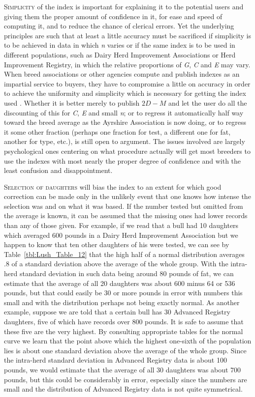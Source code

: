 \textsc{Simplicity} of the index is important for explaining
it to the potential users and giving them the proper amount of confidence
in it, for ease and speed of computing it, and to reduce the chance of
clerical errors. Yet the underlying principles are such that at least a
little accuracy must be sacrificed if simplicity is to be achieved in data
in which \textit{n} varies or if the same index is to be used in different
populations, such as Dairy Herd Improvement Associations or Herd Improvement
Registry, in which the relative proportions of \textit{G}, \textit{C} and
\textit{E} may vary. When breed associations or other agencies compute and
publish indexes as an impartial service to buyers, they have to compromise
a little on accuracy in order to achieve the uniformity and simplicity which
is necessary for getting the index used . Whether it is better merely to
publish $2D - M$ and let the user do all the discounting of this for
\textit{C}, \textit{E} and small \textit{n}; or to regress it automatically
half way toward the breed average as the Ayrshire Association is now doing,
or to regress it some other fraction (perhaps one fraction for test, a
different one for fat, another for type, etc.), is still open to argument.
The issues involved are largely psychological ones centering on what
procedure actually will get most breeders to use the indexes with most
nearly the proper degree of confidence and with the least confusion and
disappointment.

\textsc{Selection of daughters} will bias the index to an extent for which
good correction can be made only in the unlikely event that one knows
how intense the selection was and on what it was based. If the number
tested but omitted from the average is known, it can be assumed that the
missing ones had lower records than any of those given. For example,
if we read that a bull had 10 daughters which averaged 600 pounds in a
Dairy Herd Improvement Association but we happen to know that ten
other daughters of his were tested, we can see by Table~\ref{tbl:Lush_Table_12}
that the high half of a normal distribution averages .8 of a standard
deviation above the average of the whole group. With the intra-herd
standard deviation in such data being around 80 pounds of fat, we can
estimate that the average of all 20 daughters was about 600 minus 64
or 536 pounds, but that could easily be 30 or more pounds in error
with numbers this small and with the distribution perhaps not being
exactly normal. As another example, suppose we are told that a certain
bull has 30 Advanced Registry daughters, five of which have records
over 800 pounds. It is safe to assume that these five are the very
highest. By consulting appropriate tables for the normal curve we
learn that the point above which the highest one-sixth of the
population lies is about one standard deviation above the average
of the whole group. Since the intra-herd standard deviation in Advanced
Registry data is about 100 pounds, we would estimate that the average
of all 30 daughters was about 700 pounds, but this could be considerably
in error, especially since the numbers are small and the distribution
of Advanced Registry data is not quite symmetrical.


